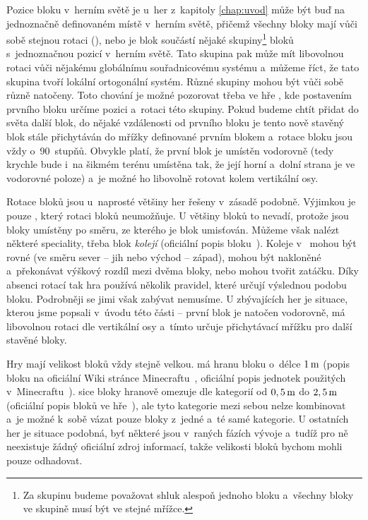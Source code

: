 Pozice bloku v~herním světě je u~her z~kapitoly \ref{chap:uvod} může být buď na jednoznačně definovaném místě v~herním světě, přičemž všechny bloky mají vůči sobě stejnou rotaci (\MC{}), nebo je blok součástí nějaké skupiny\footnote{Za skupinu budeme považovat shluk alespoň jednoho bloku a~všechny bloky ve skupině musí být ve stejné mřížce.} bloků s~jednoznačnou pozicí v~herním světě. Tato skupina pak může mít libovolnou rotaci vůči nějakému globálnímu souřadnicovému systému a~můžeme říct, že tato skupina tvoří lokální ortogonální systém. Různé skupiny mohou být vůči sobě různě natočeny. Toto chování je možné pozorovat třeba ve hře \ME{}, kde postavením prvního bloku určíme pozici a~rotaci této skupiny. Pokud budeme chtít přidat do světa další blok, do nějaké vzdálenosti od prvního bloku je tento nově stavěný blok stále přichytáván do mřížky definované prvním blokem a~rotace bloku jsou vždy o~90~stupňů. Obvykle platí, že první blok je umístěn vodorovně (tedy krychle bude i~na šikmém terénu umístěna tak, že její horní a~dolní strana je ve vodorovné poloze) a~je možné ho libovolně rotovat kolem vertikální osy.

Rotace bloků jsou u~naprosté většiny her řešeny v~zásadě podobně. Výjimkou je pouze \MC{}, který rotaci bloků neumožňuje. U většiny bloků to nevadí, protože jsou bloky umístěny po směru, ze kterého je blok umisťován. Můžeme však nalézt některé speciality, třeba blok \textit{kolejí} (oficiální popis bloku~\citep{mc_rail}). Koleje v~ mohou být rovné (ve směru sever -- jih nebo východ -- západ), mohou být nakloněné a~překonávat výškový rozdíl mezi dvěma bloky, nebo mohou tvořit zatáčku. Díky absenci rotací tak hra používá několik pravidel, které určují výslednou podobu bloku. Podrobněji se jimi však zabývat nemusíme. U zbývajících her je situace, kterou jsme popsali v~úvodu této části -- první blok je natočen vodorovně, má libovolnou rotaci dle vertikální osy a~tímto určuje přichytávací mřížku pro další stavěné bloky.

Hry mají velikost bloků vždy stejně velkou. \MC{} má hranu bloku o~délce $1\,\rm m$ (popis bloku na oficiální Wiki stránce Minecraftu~\citep{mc_block}, oficiální popis jednotek použitých v~Minecraftu~\citep{mc_units}). \SE{} sice bloky hranově omezuje dle kategorií od $0,5\,\rm m$ do $2,5\,\rm m$ (oficiální popis bloků ve hře~\citep{se_blocks_wiki}), ale tyto kategorie mezi sebou nelze kombinovat a~je možné k~sobě vázat pouze bloky z~jedné a~té samé kategorie. U ostatních her je situace podobná, byť některé jsou v~raných fázích vývoje a~tudíž pro ně neexistuje žádný oficiální zdroj informací, takže velikosti bloků bychom mohli pouze odhadovat. 

